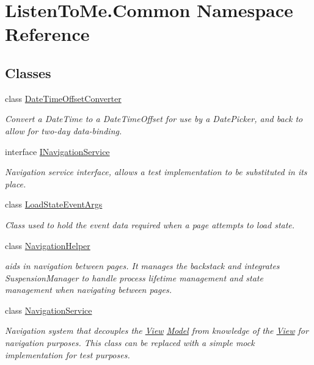 \hypertarget{namespace_listen_to_me_1_1_common}{}\section{Listen\+To\+Me.\+Common Namespace Reference}
\label{namespace_listen_to_me_1_1_common}
\subsection*{Classes}
\begin{DoxyCompactItemize}
\item 
class \hyperlink{class_listen_to_me_1_1_common_1_1_date_time_offset_converter}{Date\+Time\+Offset\+Converter}
\begin{DoxyCompactList}\small\item\em Convert a Date\+Time to a Date\+Time\+Offset for use by a Date\+Picker, and back to allow for two-\/day data-\/binding. \end{DoxyCompactList}\item 
interface \hyperlink{interface_listen_to_me_1_1_common_1_1_i_navigation_service}{I\+Navigation\+Service}
\begin{DoxyCompactList}\small\item\em Navigation service interface, allows a test implementation to be substituted in its place. \end{DoxyCompactList}\item 
class \hyperlink{class_listen_to_me_1_1_common_1_1_load_state_event_args}{Load\+State\+Event\+Args}
\begin{DoxyCompactList}\small\item\em Class used to hold the event data required when a page attempts to load state. \end{DoxyCompactList}\item 
class \hyperlink{class_listen_to_me_1_1_common_1_1_navigation_helper}{Navigation\+Helper}
\begin{DoxyCompactList}\small\item\em aids in navigation between pages. It manages the backstack and integrates Suspension\+Manager to handle process lifetime management and state management when navigating between pages. \end{DoxyCompactList}\item 
class \hyperlink{class_listen_to_me_1_1_common_1_1_navigation_service}{Navigation\+Service}
\begin{DoxyCompactList}\small\item\em Navigation system that decouples the \hyperlink{namespace_listen_to_me_1_1_view}{View} \hyperlink{namespace_listen_to_me_1_1_model}{Model} from knowledge of the \hyperlink{namespace_listen_to_me_1_1_view}{View} for navigation purposes. This class can be replaced with a simple mock implementation for test purposes. \end{DoxyCompactList}\item 

\end{DoxyCompactItemize}
